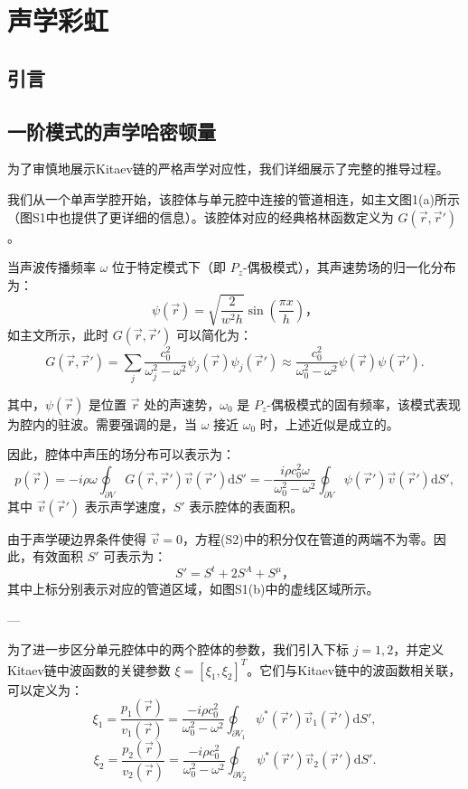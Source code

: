 \chapter{声学彩虹}
\section{引言}

\section{一阶模式的声学哈密顿量}

为了审慎地展示Kitaev链的严格声学对应性，我们详细展示了完整的推导过程。

我们从一个单声学腔开始，该腔体与单元腔中连接的管道相连，如主文图1(a)所示（图S1中也提供了更详细的信息）。该腔体对应的经典格林函数定义为 \( G(\vec{r}, \vec{r}') \)。

当声波传播频率 \( \omega \) 位于特定模式下（即 \( P_z \)-偶极模式），其声速势场的归一化分布为：
\[
\psi(\vec{r}) = \sqrt{\frac{2}{w^2 h}} \sin\left(\frac{\pi x}{h}\right)，
\]
如主文所示，此时 \( G(\vec{r}, \vec{r}') \) 可以简化为：
\[
G(\vec{r}, \vec{r}') = \sum_j \frac{c_0^2}{\omega_j^2 - \omega^2} \psi_j(\vec{r}) \psi_j(\vec{r}')
\approx \frac{c_0^2}{\omega_0^2 - \omega^2} \psi(\vec{r}) \psi(\vec{r}'). 
\]

其中，\( \psi(\vec{r}) \) 是位置 \( \vec{r} \) 处的声速势，\( \omega_0 \) 是 \( P_z \)-偶极模式的固有频率，该模式表现为腔内的驻波。需要强调的是，当 \( \omega \) 接近 \( \omega_0 \) 时，上述近似是成立的。

因此，腔体中声压的场分布可以表示为：
\[
p(\vec{r}) = -i \rho \omega \oint_{\partial V} G(\vec{r}, \vec{r}') \vec{v}(\vec{r}') \mathrm{d}S'
= -\frac{i \rho c_0^2 \omega}{\omega_0^2 - \omega^2} \oint_{\partial V} \psi(\vec{r}') \vec{v}(\vec{r}') \mathrm{d}S', 
\]
其中 \( \vec{v}(\vec{r}') \) 表示声学速度，\( S' \) 表示腔体的表面积。

由于声学硬边界条件使得 \( \vec{v} = 0 \)，方程(S2)中的积分仅在管道的两端不为零。因此，有效面积 \( S' \) 可表示为：
\[
S' = S^t + 2S^A + S^\mu，
\]
其中上标分别表示对应的管道区域，如图S1(b)中的虚线区域所示。

---

为了进一步区分单元腔体中的两个腔体的参数，我们引入下标 \( j = 1, 2 \)，并定义Kitaev链中波函数的关键参数 \( \xi = [\xi_1, \xi_2]^T \)。它们与Kitaev链中的波函数相关联，可以定义为：
\[
\xi_1 = \frac{p_1(\vec{r})}{v_1(\vec{r})} = \frac{-i \rho c_0^2}{\omega_0^2 - \omega^2} \oint_{\partial V_1} \psi^*(\vec{r}') \vec{v}_1(\vec{r}') \mathrm{d}S',
\]
\[
\xi_2 = \frac{p_2(\vec{r})}{v_2(\vec{r})} = \frac{-i \rho c_0^2}{\omega_0^2 - \omega^2} \oint_{\partial V_2} \psi^*(\vec{r}') \vec{v}_2(\vec{r}') \mathrm{d}S'. 
\]

